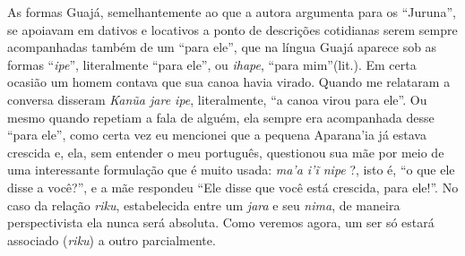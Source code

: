 As formas Guajá, semelhantemente ao que a autora argumenta para os
``Juruna'', se apoiavam em dativos e locativos a ponto de descrições
cotidianas serem sempre acompanhadas também de um ``para ele'', que na
língua Guajá aparece sob as formas ``\emph{ipe}'', literalmente ``para
ele'', ou \emph{ihape}, ``para mim''(lit.). Em certa ocasião um homem
contava que sua canoa havia virado. Quando me relataram a conversa
disseram \emph{Kanũa jare ipe}, literalmente, ``a canoa virou para
ele''. Ou mesmo quando repetiam a fala de alguém, ela sempre era
acompanhada desse ``para ele'', como certa vez eu mencionei que a
pequena Aparana'ia já estava crescida e, ela, sem entender o meu
português, questionou sua mãe por meio de uma interessante formulação
que é muito usada: \emph{ma'a i'ĩ nipe} ?, isto é, ``o que ele disse a
você?'', e a mãe respondeu ``Ele disse que você está crescida, para
ele!''. No caso da relação \emph{riku}, estabelecida entre um
\emph{jara} e seu \emph{nima}, de maneira perspectivista ela nunca será
absoluta. Como veremos agora, um ser só estará associado (\emph{riku}) a
outro parcialmente.

